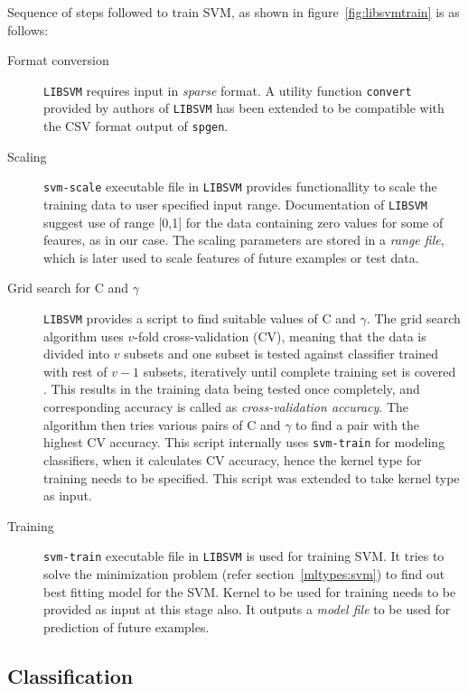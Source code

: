Sequence of steps followed to train SVM, as shown in figure~\ref{fig:libsvmtrain} is as follows:
\begin{description}
   \item[Format conversion] \texttt{LIBSVM} requires input in \emph{sparse} format. A utility function \texttt{convert} provided by authors of \texttt{LIBSVM} has been extended to be compatible with the CSV format output of \texttt{spgen}.

  \item[Scaling] \texttt{svm-scale} executable file in \texttt{LIBSVM} provides functionallity to scale the training data to user specified input range. Documentation of \texttt{LIBSVM} \cite{Hsu2003} suggest use of range [0,1] for the data containing zero values for some of feaures, as in our case. The scaling parameters are stored in a \emph{range file}, which is later used to scale features of future examples or test data.
  
  \item[Grid search for C and $\gamma$] \texttt{LIBSVM} provides a script to find suitable values of C and $\gamma$. The grid search algorithm uses $v$-fold cross-validation (CV), meaning that the data is divided into $v$ subsets and one subset is tested against classifier trained with rest of $v-1$ subsets, iteratively until complete training set is covered \cite{Hsu2003}.  This results in the training data being tested once completely, and corresponding accuracy is called as \emph{cross-validation accuracy}. The algorithm then tries various pairs of C and $\gamma$ to find a pair with the highest CV accuracy. This script internally uses \texttt{svm-train} for modeling classifiers, when it calculates CV accuracy, hence the kernel type for training needs to be specified. This script was extended to take kernel type as input.
 
 \item[Training] \texttt{svm-train} executable file in \texttt{LIBSVM} is used for training SVM. It tries to solve the minimization problem (refer section~\ref{mltypes:svm}) to find out best fitting model for the SVM. Kernel to be used for training needs to be provided as input at this stage also. It outputs a \emph{model file} to be used for prediction of future examples.
\end{description}

\subsection{Classification}


